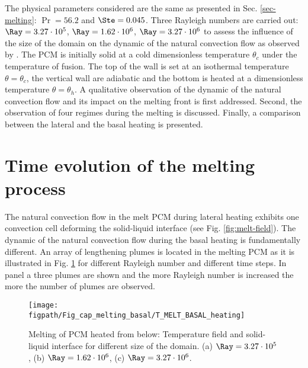 The physical parameters considered are the same as presented in Sec. \ref{sec-melting}:
$\Pr = 56.2$ and $\Ste = 0.045$.
Three Rayleigh numbers are carried out: $\Ray = 3.27 \cdot 10^5$, $\Ray = 1.62 \cdot 10^6$, $\Ray = 3.27 \cdot 10^6$ to assess the influence of the size of the domain on the dynamic of the natural convection flow
as observed by \cite{madruga2018dynamic}.
The PCM is initially solid at a cold dimensionless temperature $\theta_c$ under the temperature of fusion.
The top of the wall is set at an isothermal temperature $\theta = \theta_c$, the vertical wall are adiabatic and the bottom is heated at a dimensionless temperature $\theta = \theta_h$.
A qualitative observation of the dynamic of the natural convection flow and its impact on the melting front is first addressed.
Second, the observation of four regimes during the melting is discussed.
Finally, a comparison between the lateral and the basal heating is presented.

\section{Time evolution of the melting process} \label{sec-RB-melt-process}

The natural convection flow in the melt PCM during lateral heating exhibits one convection cell deforming the solid-liquid interface (see Fig. \ref{fig:melt-field}).
The dynamic of the natural convection flow during the basal heating is fundamentally different.
An array of lengthening plumes is located in the melting PCM as it is illustrated in Fig. \ref{fig:melt-below} for different Rayleigh number and different time steps.
In panel a three plumes are shown and the more Rayleigh number is increased the more the number of plumes are observed.

\begin{figure}
	\begin{center}
		\texttt{[image: \\figpath/Fig\_cap\_melting\_basal/T\_MELT\_BASAL\_heating]}
	\end{center}
	\caption{Melting of PCM heated from below: Temperature field and solid-liquid interface for different size of the domain. (a) $\Ray = 3.27 \cdot 10^5$, (b)  $\Ray = 1.62 \cdot 10^6$, (c) $\Ray = 3.27 \cdot 10^6$.}
	\label{fig:melt-below}
\end{figure}



